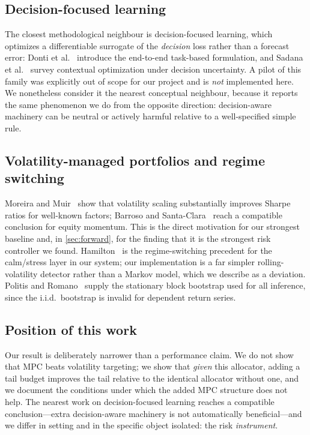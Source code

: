 \documentclass[journal]{IEEEtran}
\begin{document}
\subsection{Decision-focused learning}
The closest methodological neighbour is decision-focused learning, which optimizes
a differentiable surrogate of the \emph{decision} loss rather than a forecast
error: Donti et al.~\cite{donti2017task} introduce the end-to-end task-based
formulation, and Sadana et al.~\cite{sadana2023contextual} survey contextual
optimization under decision uncertainty. A pilot of this family was explicitly
out of scope for our project and is \emph{not} implemented here. We nonetheless
consider it the nearest conceptual neighbour, because it reports the same
phenomenon we do from the opposite direction: decision-aware machinery can be
neutral or actively harmful relative to a well-specified simple rule.

\subsection{Volatility-managed portfolios and regime switching}
Moreira and Muir~\cite{moreira2017volatility} show that volatility scaling
substantially improves Sharpe ratios for well-known factors; Barroso and
Santa-Clara~\cite{barroso2015momentum} reach a compatible conclusion for equity
momentum. This is the direct motivation for our strongest baseline and, in
\cref{sec:forward}, for the finding that it is the strongest risk controller we
found. Hamilton~\cite{hamilton1989new} is the regime-switching precedent for the
calm/stress layer in our system; our implementation is a far simpler
rolling-volatility detector rather than a Markov model, which we describe as a
deviation. Politis and Romano~\cite{politis1994stationary} supply the stationary
block bootstrap used for all inference, since the i.i.d.\ bootstrap is invalid for
dependent return series.

\subsection{Position of this work}
Our result is deliberately narrower than a performance claim. We do not show that
MPC beats volatility targeting; we show that \emph{given} this allocator, adding a
tail budget improves the tail relative to the identical allocator without one, and
we document the conditions under which the added MPC structure does not help. The
nearest work on decision-focused learning reaches a compatible conclusion---extra
decision-aware machinery is not automatically beneficial---and we differ in
setting and in the specific object isolated: the risk \emph{instrument}.
\end{document}
